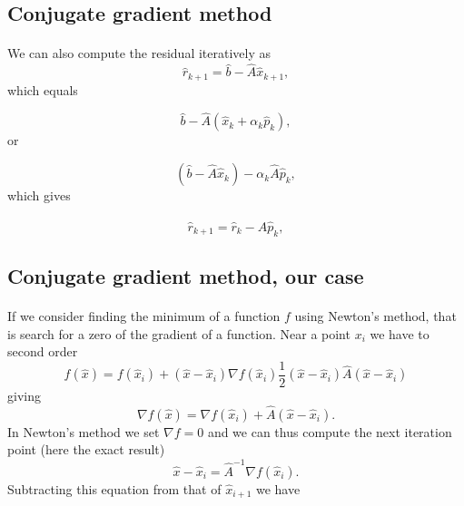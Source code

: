 \documentclass[%
twoside,                 %
final,                   %
10pt]{article}
\begin{document}
\subsection*{Conjugate gradient method}

\paragraph{}
We can also  compute the residual iteratively as
\begin{equation*}
\hat{r}_{k+1}=\hat{b}-\hat{A}\hat{x}_{k+1},
 \end{equation*}
which equals

\begin{equation*}
\hat{b}-\hat{A}(\hat{x}_k+\alpha_k\hat{p}_k),
 \end{equation*}
or

\begin{equation*}
(\hat{b}-\hat{A}\hat{x}_k)-\alpha_k\hat{A}\hat{p}_k,
 \end{equation*}
which gives

\begin{equation*}
\hat{r}_{k+1}=\hat{r}_k-\hat{A}\hat{p}_{k},
 \end{equation*}



\subsection*{Conjugate gradient method, our case}

\paragraph{}
If we consider finding the minimum of a function $f$ using Newton's method,
that is search for a zero of the gradient of a function.  Near a point $x_i$
we have to second order
\begin{equation*}
f(\hat{x})=f(\hat{x}_i)+(\hat{x}-\hat{x}_i)\nabla f(\hat{x}_i)
\frac{1}{2}(\hat{x}-\hat{x}_i)\hat{A}(\hat{x}-\hat{x}_i)
\end{equation*}
giving
\begin{equation*}
\nabla f(\hat{x})=\nabla f(\hat{x}_i)+\hat{A}(\hat{x}-\hat{x}_i).
 \end{equation*}
In Newton's method we set $\nabla f = 0$ and we can thus compute the next iteration point
(here the exact result)
\begin{equation*}
\hat{x}-\hat{x}_i=\hat{A}^{-1}\nabla f(\hat{x}_i).
\end{equation*}
Subtracting this equation from that of $\hat{x}_{i+1}$ we have
\end{document}

